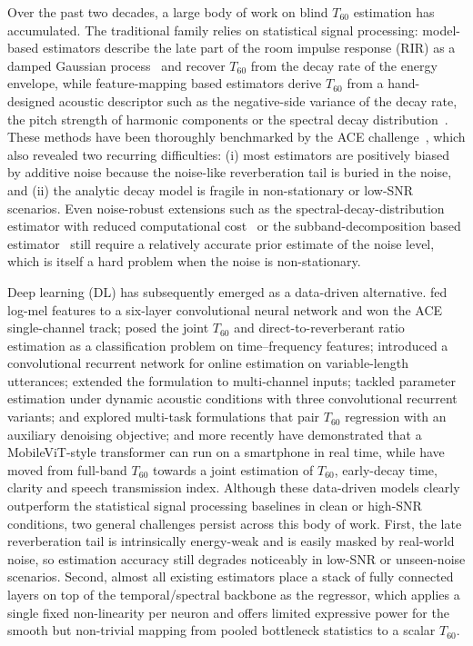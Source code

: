 \documentclass[a4paper,fleqn]{cas-sc}
\begin{document}
Over the past two decades, a large body of work on blind $T_{60}$
estimation has accumulated. The traditional family relies on statistical
signal processing: model-based estimators describe the late part of the
room impulse response (RIR) as a damped Gaussian
process~\citep{polack1988these} and recover $T_{60}$ from the decay rate
of the energy envelope, while feature-mapping based estimators derive
$T_{60}$ from a hand-designed acoustic descriptor such as the negative-side
variance of the decay rate, the pitch strength of harmonic
components or the spectral decay
distribution~\citep{ratnam2003blind, wen2008negativeside, eaton2013sdd,
falk2010temporal, lollmann2010iwaenc}. These methods have been thoroughly
benchmarked by the ACE challenge~\citep{eaton2016ace}, which also revealed
two recurring difficulties: (i) most estimators are positively biased by
additive noise because the noise-like reverberation tail is buried in the
noise, and (ii) the analytic decay model is fragile in non-stationary or
low-SNR scenarios. Even noise-robust extensions such as the
spectral-decay-distribution estimator with reduced computational
cost~\citep{eaton2013sdd} or the subband-decomposition based
estimator~\citep{prego2015subband} still require a relatively accurate
prior estimate of the noise level, which is itself a hard problem when
the noise is non-stationary.

Deep learning (DL) has subsequently emerged as a data-driven alternative.
\citet{gamper2018cnn} fed log-mel features to a six-layer convolutional
neural network and won the ACE single-channel track; \citet{xiong2018ercnn}
posed the joint $T_{60}$ and direct-to-reverberant ratio estimation as a
classification problem on time--frequency features; \citet{deng2020crnn}
introduced a convolutional recurrent network for online estimation on
variable-length utterances; \citet{srivastava2021blindroom} extended the
formulation to multi-channel inputs; \citet{goetz2023online} tackled
parameter estimation under dynamic acoustic conditions with three
convolutional recurrent variants; \citet{zheng2022noiseaware} and
\citet{zhang2024damtl} explored multi-task formulations that pair $T_{60}$
regression with an auxiliary denoising objective; and more recently
\citet{saini2023mobileaudiotransformer} have demonstrated that a
MobileViT-style transformer can run on a smartphone in real time, while
\citet{duangpummet2022stochastic} have moved from full-band $T_{60}$
towards a joint estimation of $T_{60}$, early-decay time, clarity and
speech transmission index. Although these data-driven models clearly
outperform the statistical signal processing baselines in clean or
high-SNR conditions, two general challenges persist across this body of
work. First, the late reverberation tail is intrinsically energy-weak
and is easily masked by real-world noise, so estimation accuracy still
degrades noticeably in low-SNR or unseen-noise scenarios. Second, almost
all existing estimators place a stack of fully connected layers on top
of the temporal/spectral backbone as the regressor, which applies a
single fixed non-linearity per neuron and offers limited expressive
power for the smooth but non-trivial mapping from pooled bottleneck
statistics to a scalar $T_{60}$.
\end{document}
